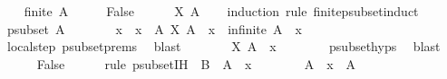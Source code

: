 \begin{isabellebody}
%
\isatagproof
{}\isamarkupfalse%
\isanewline
\ \ \isamarkupfalse%
\ {\isachardoublequoteopen}finite\ A{\isachardoublequoteclose}\isanewline
\ \ \isamarkupfalse%
\ \isamarkupfalse%
\ False\isanewline
\ \ \ \ \isamarkupfalse%
\ {\isacartoucheopen}X\ A{\isacartoucheclose}\isanewline
\ \ \isamarkupfalse%
\ {\isacharparenleft}{\kern0pt}induction\ rule{\isacharcolon}{\kern0pt}\ finite{\isacharunderscore}{\kern0pt}psubset{\isacharunderscore}{\kern0pt}induct{\isacharparenright}{\kern0pt}\isanewline
\ \ \ \ \isamarkupfalse%
\ {\isacharparenleft}{\kern0pt}psubset\ A{\isacharparenright}{\kern0pt}\isanewline
\ \ \ \ \isamarkupfalse%
\ \isamarkupfalse%
\ x\ \ {\isachardoublequoteopen}x\ {\isasymin}\ A{\isachardoublequoteclose}\ {\isachardoublequoteopen}X\ {\isacharparenleft}{\kern0pt}A\ {\isacharminus}{\kern0pt}\ {\isacharbraceleft}{\kern0pt}x{\isacharbraceright}{\kern0pt}{\isacharparenright}{\kern0pt}\ {\isasymor}\ infinite\ {\isacharparenleft}{\kern0pt}A\ {\isacharminus}{\kern0pt}\ {\isacharbraceleft}{\kern0pt}x{\isacharbraceright}{\kern0pt}{\isacharparenright}{\kern0pt}{\isachardoublequoteclose}\isanewline
\ \ \ \ \ \ \isamarkupfalse%
\ local{\isachardot}{\kern0pt}step\ psubset{\isachardot}{\kern0pt}prems\ \isamarkupfalse%
\ blast\isanewline
\ \ \ \ \isamarkupfalse%
\ \isamarkupfalse%
\ {\isachardoublequoteopen}X\ {\isacharparenleft}{\kern0pt}A\ {\isacharminus}{\kern0pt}\ {\isacharbraceleft}{\kern0pt}x{\isacharbraceright}{\kern0pt}{\isacharparenright}{\kern0pt}{\isachardoublequoteclose}\isanewline
\ \ \ \ \ \ \isamarkupfalse%
\ psubset{\isachardot}{\kern0pt}hyps\ \isamarkupfalse%
\ blast\isanewline
\ \ \ \ \isamarkupfalse%
\ False\isanewline
\ \ \ \ \isamarkupfalse%
\ {\isacharparenleft}{\kern0pt}rule\ psubset{\isachardot}{\kern0pt}IH\ {\isacharbrackleft}{\kern0pt}\ B\ {\isacharequal}{\kern0pt}\ {\isachardoublequoteopen}A\ {\isacharminus}{\kern0pt}\ {\isacharbraceleft}{\kern0pt}x{\isacharbraceright}{\kern0pt}{\isachardoublequoteclose}{\isacharbrackright}{\kern0pt}{\isacharparenright}{\kern0pt}\isanewline
\ \ \ \ \ \ \isamarkupfalse%
\ {\isachardoublequoteopen}A\ {\isacharminus}{\kern0pt}\ {\isacharbraceleft}{\kern0pt}x{\isacharbraceright}{\kern0pt}\ {\isasymsubset}\ A{\isachardoublequoteclose}\isanewline
\ \ \ \ \ \ \ \ \isamarkupfalse%

\end{isabellebody}

